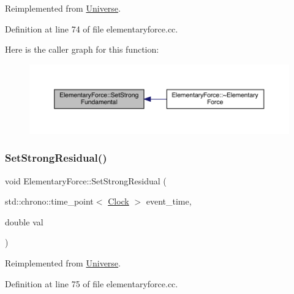 Reimplemented from \hyperlink{class_universe_aafec97a231126b71c73ac1258609a284}{Universe}.



Definition at line 74 of file elementaryforce.\+cc.

Here is the caller graph for this function\+:
\nopagebreak
\begin{figure}[H]
\begin{center}
\leavevmode
\includegraphics[width=350pt]{class_elementary_force_afb00e9a10ec33eeb1daefce39b0468b7_icgraph}
\end{center}
\end{figure}
\mbox{\label{class_elementary_force_ac25021d38c1d54bf711096ab37a461f6}} 
\subsubsection{\texorpdfstring{Set\+Strong\+Residual()}{SetStrongResidual()}}
{\footnotesize\ttfamily void Elementary\+Force\+::\+Set\+Strong\+Residual (\begin{DoxyParamCaption}\item[{std\+::chrono\+::time\+\_\+point$<$ \hyperlink{universe_8h_a0ef8d951d1ca5ab3cfaf7ab4c7a6fd80}{Clock} $>$}]{event\+\_\+time,  }\item[{double}]{val }\end{DoxyParamCaption})\hspace{0.3cm}{\ttfamily [virtual]}}



Reimplemented from \hyperlink{class_universe_a1b2d6197ddf3d613cc30bd04d22ed8b7}{Universe}.



Definition at line 75 of file elementaryforce.\+cc.


